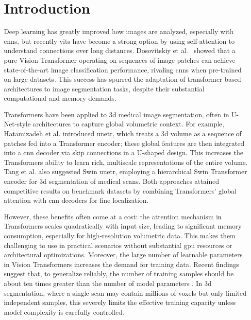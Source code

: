\chapter{Introduction}

Deep learning has greatly improved how images are analyzed, especially with \glspl{cnn}, but recently \glspl{vit} have become a strong option by using self-attention to understand connections over long distances. Dosovitskiy et al.~\cite{Dosovitskiy2021ViT} showed that a pure Vision Transformer operating on sequences of image patches can achieve state-of-the-art image classification performance, rivaling \glspl{cnn} when pre-trained on large datasets. This success has spurred the adaptation of transformer-based architectures to image segmentation tasks, despite their substantial computational and memory demands.

\medskip

Transformers have been applied to \gls{3d} medical image segmentation, often in U-Net-style architectures to capture global volumetric context. For example, Hatamizadeh et al. \cite{Hatamizadeh2022UNETR} introduced \gls{unetr}, which treats a \gls{3d} volume as a sequence of patches fed into a Transformer encoder; these global features are then integrated into a \gls{cnn} decoder via skip connections in a U-shaped design. This increases the Transformers ability to learn rich, multiscale representations of the entire volume. Tang et al. \cite{Tang2022SwinUNETR} also suggested Swin \gls{unetr}{\tiny }, employing a hierarchical Swin Transformer encoder for \gls{3d} segmentation of medical scans. Both approaches attained competitive results on benchmark datasets by combining Transformers' global attention with \gls{cnn} decoders for fine localization.

\medskip

However, these benefits often come at a cost: the attention mechanism in Transformers scales quadratically with input size, leading to significant memory consumption, especially for high-resolution volumetric data. This makes them challenging to use in practical scenarios without substantial \gls{gpu} resources or architectural optimizations. Moreover, the large number of learnable parameters in Vision Transformers increases the demand for training data. Recent findings suggest that, to generalize reliably, the number of training samples should be about ten times greater than the number of model parameters \cite{ALWOSHEEL2018167}.
In \gls{3d} segmentation, where a single scan may contain millions of voxels but only limited independent samples, this severely limits the effective training capacity unless model complexity is carefully controlled.

